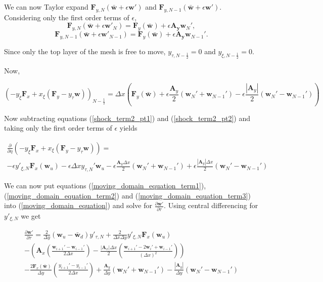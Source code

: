 \documentclass[10pt]{article}
\begin{document}
	We can now Taylor expand $\mathbf{F}_{y,N}(\bar{\mathbf{w}} + \epsilon \mathbf{w}')$ and $\mathbf{F}_{y,N-1}(\bar{\mathbf{w}} + \epsilon \mathbf{w}')$. Considering only the first order terms of $\epsilon$,
	$$ \mathbf{F}_{y,N}(\bar{\mathbf{w}} + \epsilon \mathbf{w}'_{N}) = \mathbf{F}_{y}(\bar{\mathbf{w}}) + \epsilon \mathbf{A_y} \mathbf{w}_{N}', $$
	$$ \mathbf{F}_{y,N-1}(\bar{\mathbf{w}} + \epsilon \mathbf{w}'_{N-1}) = \mathbf{F}_{y}(\bar{\mathbf{w}}) + \epsilon \mathbf{A_y} \mathbf{w}_{N-1}'. $$
	
	Since only the top layer of the mesh is free to move, $y_{\tau,N-\frac{1}{2}}=0$ and $y_{\xi,N-\frac{1}{2}}=0$.
	
	Now,
	
	\begin{equation} \label{shock_term2_pt2}
		(-y_\xi \mathbf{F}_x + x_\xi (\mathbf{F}_y - y_\tau \mathbf{w}))_{N-\frac{1}{2}} 
		= \Delta x \left( \mathbf{F}_{y}(\bar{\mathbf{w}}) + \epsilon \frac{\mathbf{A}_y}{2} \left( \mathbf{w}_{N}' + \mathbf{w}_{N-1}' \right) - \epsilon \frac{|\mathbf{A}_y|}{2} \left( \mathbf{w}_N' - \mathbf{w}_{N-1}' \right) \right)
	\end{equation}
	
	Now subtracting  equations (\ref{shock_term2_pt1}) and (\ref{shock_term2_pt2}) and taking only the first order terms of $\epsilon$ yields
	
	\begin{multline} \label{moving_domain_equation_term3}
		\frac{\partial}{\partial \eta} (-y_\xi \mathbf{F}_x + x_\xi (\mathbf{F}_y - y_\tau \mathbf{w})) = 
		\\- \epsilon y'_{\xi,N} \mathbf{F}_{x}(\mathbf{w}_u)
		- \epsilon \Delta x y_{\tau,N}' \mathbf{w}_u
		- \epsilon \frac{\mathbf{A}_y \Delta x}{2} \left( \mathbf{w}_{N}' + \mathbf{w}_{N-1}' \right) 
		+ \epsilon \frac{|\mathbf{A}_y| \Delta x}{2} ( \mathbf{w}_N' - \mathbf{w}_{N-1}')
	\end{multline}
	
	We can now put equations (\ref{moving_domain_equation_term1}), (\ref{moving_domain_equation_term2}) and (\ref{moving_domain_equation_term3}) into (\ref{moving_domain_equation}) and solve for $\frac{\partial \mathbf{w}'}{\partial \tau}$. Using central differencing for $y'_{\xi,N}$ we get
		
	\begin{multline}\label{dwydt}
		\frac{\partial \mathbf{w}'}{\partial \tau} = 
		\frac{2}{\Delta y} (\mathbf{w}_u - \bar{\mathbf{w}}_d) y'_{\tau,N}
		+ \frac{2}{\Delta x \Delta y} y'_{\xi,N} \mathbf{F}_{x}(\mathbf{w}_u)
		\\- \left( \mathbf{A}_x \left( \frac{\mathbf{w}_{i+1}' - \mathbf{w}_{i-1}'}{2 \Delta x}\right) - \frac{|\mathbf{A}_x| \Delta x}{2} \left( \frac{\mathbf{w}_{i+1}' - 2 \mathbf{w}_i' + \mathbf{w}_{i-1}'}{(\Delta x)^2} \right) \right)
		\\ - \frac{2 \mathbf{F}_{x}(\bar{\mathbf{w}})}{\Delta y}    \left( \frac{y_{i+1}' - y_{i-1}'}{2 \Delta x} \right)
		+ \frac{\mathbf{A}_y}{\Delta y} (\mathbf{w}_N' + \mathbf{w}_{N-1}')
		- \frac{|\mathbf{A}_y|}{\Delta y} (\mathbf{w}_N' - \mathbf{w}_{N-1}')
	\end{multline}
\end{document}
